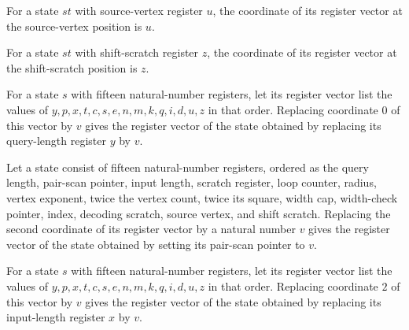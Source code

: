 \begin{lemma}
\label{Complexity.PathHard.St.toV_u}
\leanok
{}
For a state $st$ with source-vertex register $u$, the coordinate of its register vector
at the source-vertex position is $u$.
\end{lemma}

\begin{lemma}
\label{Complexity.PathHard.St.toV_z}
\leanok
{}
For a state $st$ with shift-scratch register $z$, the coordinate of its register vector
at the shift-scratch position is $z$.
\end{lemma}

\begin{lemma}
\label{Complexity.PathHard.St.upd_y}
\leanok
{}
For a state $s$ with fifteen natural-number registers, let its register vector list the
values of $y,p,x,t,c,s,e,n,m,k,q,i,d,u,z$ in that order. Replacing coordinate $0$ of
this vector by $v$ gives the register vector of the state obtained by replacing its
query-length register $y$ by $v$.
\end{lemma}

\begin{lemma}
\label{Complexity.PathHard.St.upd_p}
\leanok
{}
Let a state consist of fifteen natural-number registers, ordered as the query length,
pair-scan pointer, input length, scratch register, loop counter, radius, vertex
exponent, twice the vertex count, twice its square, width cap, width-check pointer,
index, decoding scratch, source vertex, and shift scratch. Replacing the second
coordinate of its register vector by a natural number $v$ gives the register vector of
the state obtained by setting its pair-scan pointer to $v$.
\end{lemma}

\begin{lemma}
\label{Complexity.PathHard.St.upd_x}
\leanok
{}
For a state $s$ with fifteen natural-number registers, let its register vector list the
values of $y,p,x,t,c,s,e,n,m,k,q,i,d,u,z$ in that order. Replacing coordinate $2$ of
this vector by $v$ gives the register vector of the state obtained by replacing its
input-length register $x$ by $v$.
\end{lemma}

